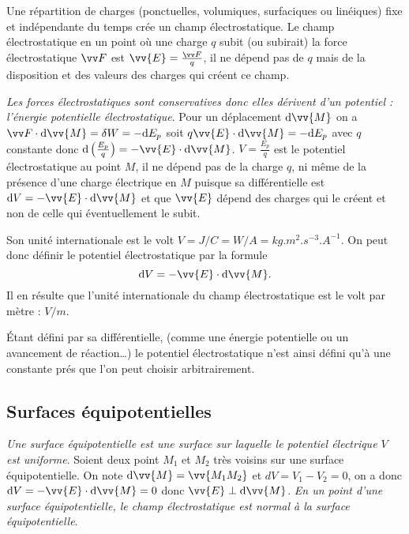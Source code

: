 Une répartition de charges (ponctuelles, volumiques, surfaciques ou linéiques) 
fixe et indépendante du temps crée un champ électrostatique. Le champ 
électrostatique en un point où une charge \(q\) subit (ou subirait) la force 
électrostatique \(\vF\)  est \(\vv{E} = \frac{\vF}{q}\), il ne dépend pas de 
\(q\) mais de la disposition et des valeurs des charges qui créent ce champ.

\emph{Les forces électrostatiques sont conservatives donc elles dérivent d'un 
potentiel : l'énergie potentielle électrostatique}. Pour un déplacement \(\D 
\vv{M}\) on a \(\vF \cdot \D \vv{M}=\delta W = -\D E_p\) soit \( q \vv{E} \cdot 
\D \vv{M}=-\D E_p\) avec \(q\) constante donc \(\D \left(\frac{E_p}{q}\right) = 
-\vv{E} \cdot \D \vv{M}\).%
\(V = \frac{E_p}{q}\) est le potentiel électrostatique au point \(M\), il ne 
dépend pas de la charge \(q\), ni même de la présence d'une charge électrique 
en \(M\) puisque sa différentielle est \(\D V = -\vv{E} \cdot \D \vv{M}\) et 
que \(\vv{E}\) dépend des charges qui le créent et non de celle qui 
éventuellement le subit.

Son unité internationale est le volt \(\si{V} = \si{J/C} =\si{W/A} = 
\si{kg.m^2.s^{-3}.A^{-1}}\). On peut donc définir le potentiel électrostatique 
par la formule
\begin{equation}%
 \D V = -\vv{E} \cdot \D \vv{M}.
\end{equation}%
Il en résulte que l'unité internationale du champ électrostatique est le volt 
par mètre : \(\si{V/m}\).

Étant défini par sa différentielle, (comme une énergie potentielle ou un 
avancement de réaction\ldots) le potentiel électrostatique n'est ainsi défini qu'à 
une constante prés que l'on peut choisir arbitrairement.

\subsection{Surfaces équipotentielles}%
\label{chap9-subsec:surfacesequipotentielles}%

\emph{Une surface équipotentielle est une surface sur laquelle le potentiel 
électrique \(V\) est uniforme}. Soient deux point \(M_1\) et \(M_2\) très 
voisins sur une surface équipotentielle. On note \(\D \vv{M}=\vv{M_1M_2}\) et 
\(dV= V_1 - V_2 = 0\), on a donc \(\D V = -\vv{E}\cdot\D \vv{M} = 0\)  donc 
\(\vv{E} \perp \D \vv{M}\).%
\emph{En un point d'une surface équipotentielle, le champ électrostatique est 
normal à la surface équipotentielle}.%

